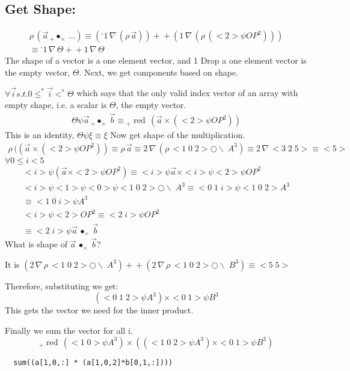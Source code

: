 \documentclass[a4paper,12pt]{article}
\newcommand{\minus}{{}^{\boldsymbol{\mbox{-}}\!}} %
\newcommand{\shape}{\rho\,}                       %
\newcommand{\drop}{\,\nabla\,}                    %
\newcommand{\transpose}{\bigcirc\!\!\!\!\!\backslash\;} %
\newcommand{\vc}[1]{<#1>}                         %
\newcommand{\vcc}[2]{<#1\;#2>}                    %
\newcommand{\vccc}[3]{<#1\;#2\;#3>}               %
\newcommand{\outerprod}[1]{\,\bullet_{#1}\,}              %
\newcommand{\innerprod}[2]{\,{}_{#1}\!\!\bullet_{#2}\,}   %
\DeclareMathOperator{\red}{red}
\newcommand{\reduce}[1]{{}_{#1}\!\red\,}          %
\newcommand{\cat}{+\!\!\!+}
\begin{document}
\subsection{Get Shape:}
\begin{eqnarray}
\shape (\vec a \innerprod+\times \ldots ) \equiv (\minus1 \drop (\shape \vec a) )\cat (1 \drop (\shape (\vc2 \psi {OP}^2))) \\ 
\equiv \minus1 \drop \Theta \cat 1 \drop \Theta
\end{eqnarray}
The shape of a vector is a one element vector, and 1 Drop a one element vector is the empty vector, $\Theta$.
Next, we get components based on shape.

$\forall \vec i s.t. 0  \leq^* \vec i <^* \Theta $ which says that the only valid index vector of an array with empty shape, i.e. a scalar is $\Theta$, the empty vector. 
\begin{eqnarray}
\Theta \psi \vec a \innerprod+\times \vec b \equiv \reduce+ (\vec a \times (\vc2 \psi {OP}^2))
\end{eqnarray}
This is an identity, $\Theta \psi \xi \equiv \xi$ Now get shape of the multiplication.
\begin{eqnarray}
\shape ((\vec a \times (<2> \psi {OP}^2)) \equiv \shape \vec a \equiv  2 \drop (\shape < 1\;0\;2> \transpose A^3 )\equiv 2 \drop \vccc325 \equiv <5>
\end{eqnarray}
$\forall 0 \leq i <5 $
\begin{eqnarray}
\vc i \psi(\vec a \times \vc2\psi {OP}^2) \equiv \vc i \psi \vec a \times \vc i \psi \vc2 \psi {OP}^2 \\
\vc i \psi \vc1 \psi \vc0 \psi \vccc102 \transpose A^3 \equiv \vccc01i \psi \vccc102 A^3\\
\equiv \vccc10i \psi   A^3\\
\vc i \psi  \vc2 {OP}^2 \equiv \vcc2i \psi {OP}^2\\
\equiv \vcc2i \psi {\vec a \outerprod\times \vec b}
\end{eqnarray}
What is shape of $\vec a \outerprod\times \vec b $? 

It is $(2\drop \shape \vccc102\transpose A^3) \cat (2\drop \shape \vccc102 \transpose B^3) \equiv \vcc55$

Therefore, substituting we get:
\[ (\vccc012 \psi A^3) \times \vcc01 \psi B^3\]
This gets the vector we need for the inner product. 

Finally we sum the vector for all i.
\[ \reduce+ (\vcc10\psi A^3) \times(( \vccc102 \psi A^3)\times \vcc01 \psi B^3)\]
\begin{verbatim}
  sum((a[1,0,:] * (a[1,0,2]*b[0,1,:])))
\end{verbatim}
\newpage
\end{document}
